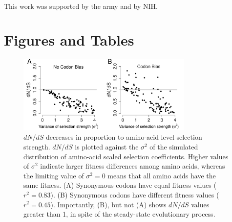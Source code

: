 \documentclass{pnastwo}
\begin{document}
\begin{article}
		
\begin{acknowledgments}
	This work was supported by the army and by NIH.
\end{acknowledgments}
		

		
		


		
		
\end{article}
	
	
\section*{Figures and Tables }

\vspace{2cm}
	
\begin{figure}[htbp]
	\centerline{\includegraphics[width=8.7cm]{figures/MainText/dnds_variance.pdf}}
	\caption{\label{dnds_variance} $dN/dS$ decreases in proportion to amino-acid level selection strength. $dN/dS$ is plotted against the $\sigma^2 $ of the simulated distribution of amino-acid scaled selection coefficients. Higher values of $\sigma^2$ indicate larger fitness differences among amino acids, whereas the limiting value of $\sigma^2 = 0$ means that all amino acids have the same fitness. (A) Synonymous codons have equal fitness values ($r^2=0.83$). (B) Synonymous codons have different fitness values ($r^2=0.45$). Importantly, (B), but not (A) shows $dN/dS$ values greater than 1, in spite of the steady-state evolutionary process.}
\end{figure}
		
		
\vspace{2cm}
		
\end{document}

